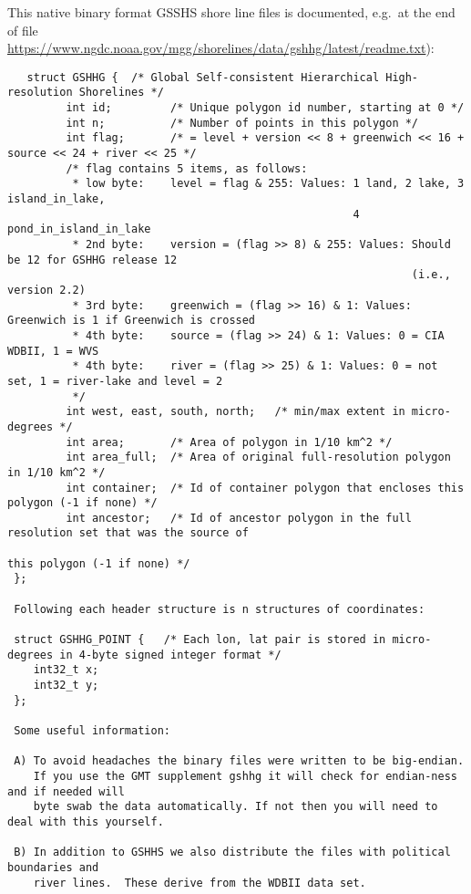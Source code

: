 This native binary format GSSHS shore line files is documented, e.g.\ at the end of file 
\url{https://www.ngdc.noaa.gov/mgg/shorelines/data/gshhg/latest/readme.txt}):
{\scriptsize
\begin{verbatim}
   struct GSHHG {  /* Global Self-consistent Hierarchical High-resolution Shorelines */
         int id;         /* Unique polygon id number, starting at 0 */
         int n;          /* Number of points in this polygon */
         int flag;       /* = level + version << 8 + greenwich << 16 + source << 24 + river << 25 */
         /* flag contains 5 items, as follows:
          * low byte:    level = flag & 255: Values: 1 land, 2 lake, 3 island_in_lake, 
                                                     4 pond_in_island_in_lake
          * 2nd byte:    version = (flag >> 8) & 255: Values: Should be 12 for GSHHG release 12 
                                                              (i.e., version 2.2)
          * 3rd byte:    greenwich = (flag >> 16) & 1: Values: Greenwich is 1 if Greenwich is crossed
          * 4th byte:    source = (flag >> 24) & 1: Values: 0 = CIA WDBII, 1 = WVS
          * 4th byte:    river = (flag >> 25) & 1: Values: 0 = not set, 1 = river-lake and level = 2
          */
         int west, east, south, north;   /* min/max extent in micro-degrees */
         int area;       /* Area of polygon in 1/10 km^2 */
         int area_full;  /* Area of original full-resolution polygon in 1/10 km^2 */
         int container;  /* Id of container polygon that encloses this polygon (-1 if none) */
         int ancestor;   /* Id of ancestor polygon in the full resolution set that was the source of 
                                                                        this polygon (-1 if none) */
 };

 Following each header structure is n structures of coordinates:

 struct GSHHG_POINT {	/* Each lon, lat pair is stored in micro-degrees in 4-byte signed integer format */
 	int32_t x;
 	int32_t y;
 };

 Some useful information:

 A) To avoid headaches the binary files were written to be big-endian.
    If you use the GMT supplement gshhg it will check for endian-ness and if needed will
    byte swab the data automatically. If not then you will need to deal with this yourself.

 B) In addition to GSHHS we also distribute the files with political boundaries and
    river lines.  These derive from the WDBII data set.


\end{verbatim}}
